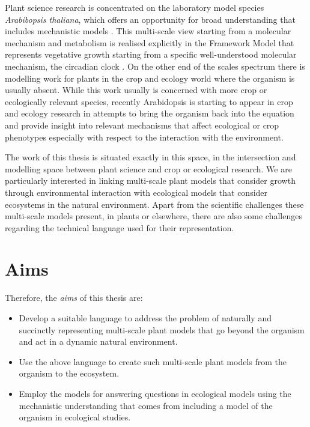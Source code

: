 Plant science research is concentrated on the laboratory model species
\emph{Arabibopsis thaliana}, which offers an opportunity for broad understanding
that includes mechanistic models \citep{chew_mathematical_2014,
  voss_modelling_2014}. This multi-scale view starting from a molecular
mechanism and metabolism is realised explicitly in the Framework Model that
represents vegetative growth starting from a specific well-understood
molecular mechanism, the circadian clock \citep[FMv1]{chew_multiscale_2014}. On
the other end of the scales spectrum there is modelling work for plants in the
crop and ecology world where the organism is usually absent. While this work
usually is concerned with more crop or ecologically relevant species, recently
Arabidopsis is starting to appear in crop and ecology research in attempts to
bring the organism back into the equation and provide insight into relevant
mechanisms that affect ecological or crop phenotypes especially with respect to
the interaction with the environment.

The work of this thesis is situated exactly in this space, in the intersection
and modelling space between plant science and crop or ecological
research. We are particularly interested in linking multi-scale plant models
that consider growth through environmental interaction with ecological models
that consider ecosystems in the natural environment.  Apart from the scientific
challenges these multi-scale models present, in plants or elsewhere, there are
also some challenges regarding the technical language used for their
representation.

\section{Aims}
\label{sec:aims}
Therefore, the \emph{aims} of this thesis are:
\begin{itemize}
\item Develop a suitable language to address the problem of naturally and
  succinctly representing multi-scale plant models that go beyond the organism
  and act in a dynamic natural environment.
\item Use the above language to create such multi-scale plant models from the
  organism to the ecosystem.
\item Employ the models for answering questions in ecological models using the
  mechanistic understanding that comes from including a model of the organism in
  ecological studies.
\end{itemize}

